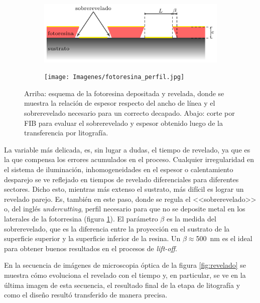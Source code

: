 {					%
 				\begin{figure}[hb!]
 				\centering
 				\begin{subfigure}[t]{0.75\textwidth}
 				\hspace{0.46cm}\includegraphics[width=\textwidth]{Esquemas/altura-ancho.pdf}
 				\end{subfigure}
 				\begin{subfigure}[t]{0.65\textwidth}
 				\texttt{[image: Imagenes/fotoresina\_perfil.jpg]}
 				\end{subfigure}
 				\caption[Perfil de fotorresina para el decapado o\textit{ lift-off}]{Arriba: esquema de la fotoresina depositada y revelada, donde se muestra la relación de espesor respecto del ancho de línea y el sobrerevelado necesario para un correcto decapado. Abajo: corte por FIB para evaluar el sobrerevelado y espesor obtenido luego de la transferencia por litografía.}
 				\label{fig:undercut}
 				\end{figure}

 	   		 La variable más delicada, es, sin lugar a dudas, el tiempo de revelado, ya que es la que compensa los errores acumulados en el proceso. Cualquier irregularidad en el sistema de iluminación, inhomogeneidades en el espesor o calentamiento desparejo se ve reflejado en tiempos de revelado diferenciales para diferentes sectores. Dicho esto, mientras más extenso el sustrato, más difícil es lograr un revelado parejo. Es, también en este paso, donde se regula el <<sobrerevelado>> o, del inglés \textit{undercutting}, perfil necesario para que no se deposite metal en los laterales de la fotorresina (figura \ref{fig:undercut}). El parámetro $\beta$ es la medida del sobrerevelado, que es la diferencia entre la proyección en el sustrato de la superficie superior y la superficie inferior de la resina. Un $\beta\!\!\approx$\SI{500}{\nm} es el ideal para obtener buenos resultados en el procesos de \textit{lift-off}. 
 
 	         En la secuencia de imágenes de microscopia óptica de la figura \ref{fig:revelado} se muestra cómo evoluciona el revelado con el tiempo y, en particular, se ve en la última imagen de esta secuencia, el resultado final de la etapa de litografía y como el diseño resultó transferido de manera precisa.

}
